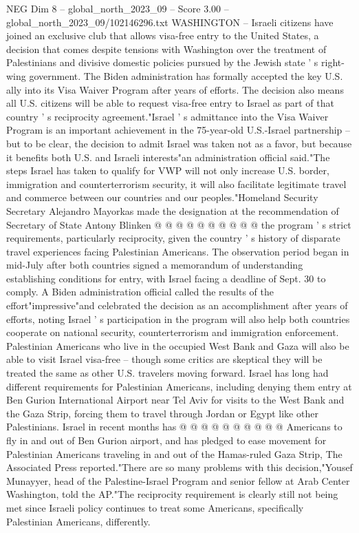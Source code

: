 \begin{textsample}{NEG Dim 8 – global\_north\_2023\_09 – Score 3.00 – global\_north\_2023\_09/102146296.txt}  \label{ex:f8_neg_159}
WASHINGTON -- Israeli citizens have joined an exclusive club that allows visa-free entry to the United States, a decision that comes despite tensions with Washington over the treatment of Palestinians and divisive domestic policies pursued by the Jewish state ' s right-wing government.
The Biden administration has formally accepted the key U.S. ally into its Visa Waiver Program after years of efforts.
The decision also means all U.S. citizens will be able to request visa-free entry to Israel as part of that country ' s reciprocity agreement."Israel ' s admittance into the Visa Waiver Program is an important achievement in the 75-year-old U.S.-Israel partnership -- but to be clear, the decision to admit Israel was taken not as a favor, but because it benefits both U.S. and Israeli interests"an administration official said."The steps Israel has taken to qualify for VWP will not only increase U.S. border, immigration and counterterrorism security, it will also facilitate legitimate travel and commerce between our countries and our peoples."Homeland Security Secretary Alejandro Mayorkas made the designation at the recommendation of Secretary of State Antony Blinken @ @ @ @ @ @ @ @ @ @ the program ' s strict requirements, particularly reciprocity, given the country ' s history of disparate travel experiences facing Palestinian Americans.
The observation period began in mid-July after both countries signed a memorandum of understanding establishing conditions for entry, with Israel facing a deadline of Sept. 30 to comply.
A Biden administration official called the results of the effort"impressive"and celebrated the decision as an accomplishment after years of efforts, noting Israel ' s participation in the program will also help both countries cooperate on national security, counterterrorism and immigration enforcement.
Palestinian Americans who live in the occupied West Bank and Gaza will also be able to visit Israel visa-free -- though some critics are skeptical they will be treated the same as other U.S. travelers moving forward.
Israel has long had different requirements for Palestinian Americans, including denying them entry at Ben Gurion International Airport near Tel Aviv for visits to the West Bank and the Gaza Strip, forcing them to travel through Jordan or Egypt like other Palestinians.
Israel in recent months has @ @ @ @ @ @ @ @ @ @ Americans to fly in and out of Ben Gurion airport, and has pledged to ease movement for Palestinian Americans traveling in and out of the Hamas-ruled Gaza Strip, The Associated Press reported."There are so many problems with this decision,"Yousef Munayyer, head of the Palestine-Israel Program and senior fellow at Arab Center Washington, told the AP."The reciprocity requirement is clearly still not being met since Israeli policy continues to treat some Americans, specifically Palestinian Americans, differently.

\end{textsample}
